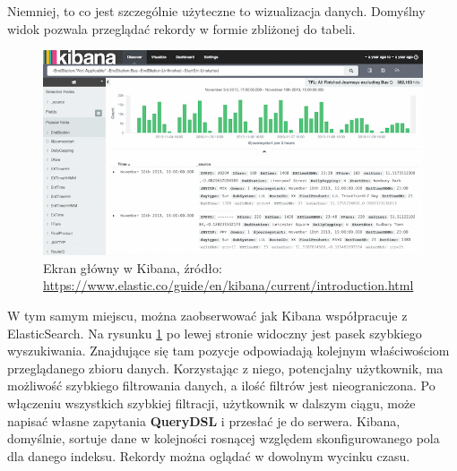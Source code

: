     Niemniej, to co jest szczególnie użyteczne to wizualizacja danych. Domyślny widok pozwala przeglądać 
    rekordy w formie zbliżonej do tabeli. 
    \begin{figure}[H]
        \centering
        \includegraphics[width=1.0\textwidth]{images/kibana_main_view}
        \caption[Ekran główny w Kibana]{
            Ekran główny w Kibana, źródło: \url{https://www.elastic.co/guide/en/kibana/current/introduction.html}
        }
        \label{chapter:application:elkstack:kibana:main_view}
    \end{figure}
    W tym samym miejscu, można zaobserwować jak Kibana współpracuje z ElasticSearch. Na rysunku \ref{chapter:application:elkstack:kibana:main_view} po lewej stronie widoczny jest pasek szybkiego
    wyszukiwania. Znajdujące się tam pozycje odpowiadają kolejnym właściwościom przeglądanego zbioru danych.
    Korzystając z niego, potencjalny użytkownik, ma możliwość szybkiego filtrowania danych, a ilość filtrów jest
    nieograniczona. Po włączeniu wszystkich szybkiej filtracji, użytkownik w dalszym ciągu, może napisać
    własne zapytania \textbf{QueryDSL} i przesłać je do serwera. Kibana, domyślnie, sortuje dane w kolejności
    rosnącej względem skonfigurowanego pola dla danego indeksu. Rekordy można oglądać w dowolnym wycinku czasu.
    

